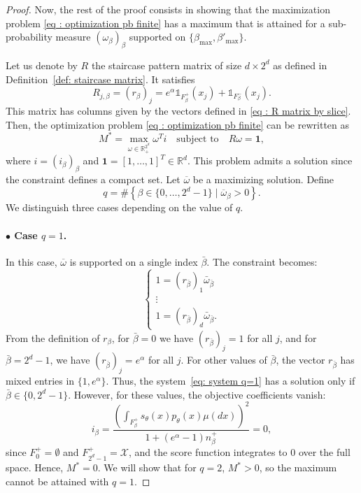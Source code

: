\documentclass[a4paper, 11pt]{article}
\theoremstyle{definition}
\newcommand{\R}{{\mathbb{R}}}
\newcommand{\indi}[1]{\mathds{1}_{#1}}
\begin{document}
{\begin{proof}
 Now, the rest of the proof consists in showing that the maximization problem \eqref{eq : optimization pb finite} has a maximum that is attained for a sub-probability measure $(\omega_\beta)_{\beta}$ supported on $\{\beta_\text{max},\beta'_\text{max}\}$.

Let us denote by $R$ the staircase pattern matrix of size $d \times 2^d$ as defined in Definition~\ref{def: staircase matrix}. It satisfies
\[
R_{j,\beta} = (r_\beta)_j = e^\alpha \indi{F^+_\beta}(x_j) + \indi{F^-_\beta}(x_j).
\]
This matrix has columns given by the vectors defined in \eqref{eq : R matrix by slice}. Then, the optimization problem \eqref{eq : optimization pb finite} can be rewritten as
\[
M^* = \max_{\omega \in \R^{2^d}_+} \omega^T i \quad \text{subject to} \quad R \omega = \bm{1},
\]
where $i = (i_\beta)_\beta$ and $\bm{1} = [1, \dots, 1]^T \in \R^d$. This problem admits a solution since the constraint defines a compact set. Let $\overline{\omega}$ be a maximizing solution. Define 
\[
q = \#\left\{ \beta \in \{0, \dots, 2^d - 1\} \mid \overline{\omega}_\beta > 0 \right\}.
\]
We distinguish three cases depending on the value of $q$.

\paragraph{$\bullet$ Case $q = 1$.}
In this case, 
 $\overline{\omega}$ is
 supported on a single index $\bar{\beta}$. The constraint becomes:
\begin{equation}\label{eq: system q=1}
\begin{cases}
1 = (r_{\bar{\beta}})_1 \bar{\omega}_{\bar{\beta}} \\
\vdots \\
1 = (r_{\bar{\beta}})_d \bar{\omega}_{\bar{\beta}}.
\end{cases}
\end{equation}
From the definition of $r_\beta$, for $\bar{\beta} = 0$ we have $(r_{\bar{\beta}})_j = 1$ for all $j$, and for $\bar{\beta} = 2^d - 1$, we have $(r_{\bar{\beta}})_j = e^\alpha$ for all $j$. For other values of $\bar{\beta}$, the vector $r_{\bar{\beta}}$ has mixed entries in $\{1, e^\alpha\}$. Thus, the system~\eqref{eq: system q=1} has a solution only if $\bar{\beta} \in \{0, 2^d - 1\}$. However, for these values, the objective coefficients vanish:
\[
i_\beta = \frac{\left( \int_{F^+_\beta} s_{\theta}(x) p_\theta(x)\mu(dx)\right)^2}{1 + (e^\alpha - 1) n^+_\beta} = 0,
\]
since $F^+_0 = \emptyset$ and $F^+_{2^d - 1} = \mathcal{X}$, and the score function integrates to $0$ over the full space. Hence, $M^* = 0$. We will show that for $q = 2$, $M^* > 0$, so the maximum cannot be attained with $q = 1$.


\end{proof}}
\end{document}
